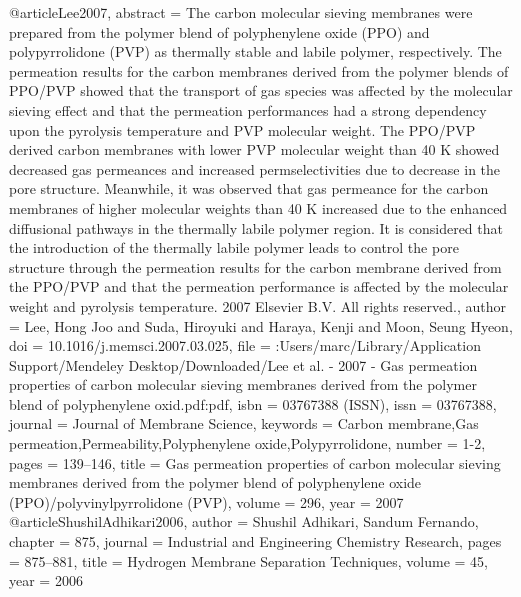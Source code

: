 @article{Lee2007,
abstract = {The carbon molecular sieving membranes were prepared from the polymer blend of polyphenylene oxide (PPO) and polypyrrolidone (PVP) as thermally stable and labile polymer, respectively. The permeation results for the carbon membranes derived from the polymer blends of PPO/PVP showed that the transport of gas species was affected by the molecular sieving effect and that the permeation performances had a strong dependency upon the pyrolysis temperature and PVP molecular weight. The PPO/PVP derived carbon membranes with lower PVP molecular weight than 40 K showed decreased gas permeances and increased permselectivities due to decrease in the pore structure. Meanwhile, it was observed that gas permeance for the carbon membranes of higher molecular weights than 40 K increased due to the enhanced diffusional pathways in the thermally labile polymer region. It is considered that the introduction of the thermally labile polymer leads to control the pore structure through the permeation results for the carbon membrane derived from the PPO/PVP and that the permeation performance is affected by the molecular weight and pyrolysis temperature. {\textcopyright} 2007 Elsevier B.V. All rights reserved.},
author = {Lee, Hong Joo and Suda, Hiroyuki and Haraya, Kenji and Moon, Seung Hyeon},
doi = {10.1016/j.memsci.2007.03.025},
file = {:Users/marc/Library/Application Support/Mendeley Desktop/Downloaded/Lee et al. - 2007 - Gas permeation properties of carbon molecular sieving membranes derived from the polymer blend of polyphenylene oxid.pdf:pdf},
isbn = {03767388 (ISSN)},
issn = {03767388},
journal = {Journal of Membrane Science},
keywords = {Carbon membrane,Gas permeation,Permeability,Polyphenylene oxide,Polypyrrolidone},
number = {1-2},
pages = {139--146},
title = {{Gas permeation properties of carbon molecular sieving membranes derived from the polymer blend of polyphenylene oxide (PPO)/polyvinylpyrrolidone (PVP)}},
volume = {296},
year = {2007}
}
@article{ShushilAdhikari2006,
author = {{Shushil Adhikari}, Sandum Fernando},
chapter = {875},
journal = {Industrial and Engineering Chemistry Research},
pages = {875--881},
title = {{Hydrogen Membrane Separation Techniques}},
volume = {45},
year = {2006}
}
